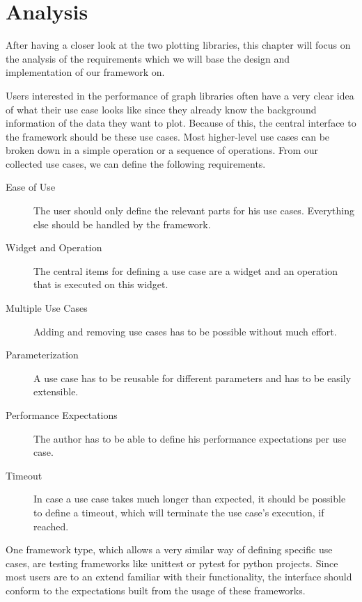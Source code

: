 
\section{Analysis}
\label{sec:application:analysis}

After having a closer look at the two plotting libraries, this chapter will
focus on the analysis of the requirements which we will base the design and
implementation of our framework on.

Users interested in the performance of graph libraries often have a very clear
idea of what their use case looks like since they already know the background
information of the data they want to plot. Because of this, the central
interface to the framework should be these use cases. Most higher-level use
cases can be broken down in a simple operation or a sequence of operations. From
our collected use cases, we can define the following requirements.

\begin{description}
    \item[Ease of Use] 
        The user should only define the relevant parts for his use cases.
        Everything else should be handled by the framework.
    \item[Widget and Operation]
        The central items for defining a use case are a widget and an operation
        that is executed on this widget.
    \item[Multiple Use Cases]
        Adding and removing use cases has to be possible without much effort.
    \item[Parameterization]
        A use case has to be reusable for different parameters and has to be
        easily extensible.
    \item[Performance Expectations]
        The author has to be able to define his performance expectations per use
        case.
    \item[Timeout]
        In case a use case takes much longer than expected, it should be possible
        to define a timeout, which will terminate the use case's execution, if
        reached.
\end{description}

One framework type, which allows a very similar way of defining specific use
cases, are testing frameworks like unittest or pytest for python projects. Since
most users are to an extend familiar with their functionality, the interface
should conform to the expectations built from the usage of these frameworks.

